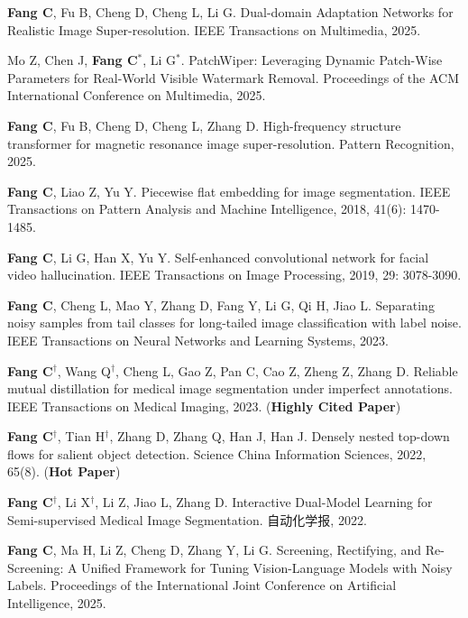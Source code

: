 \documentclass[a4paper,36pt]{article}
\newcommand{\tb}[1]{\textbf{#1}}
\newcommand{\resumeItemWithoutTitle}[1]{
  \item\justifying\small{
    {#1 \vspace{-2pt}}
  }
}
\newcommand{\resumeChnItemWithoutTitle}[1]{
  \item\justifying\small{
    {\begin{CJK}{UTF8}{gbsn}#1\end{CJK} \vspace{-2pt}}
  }
}
\begin{document}
\resumeItemWithoutTitle{\tb{Fang C}, Fu B, Cheng D, Cheng L, Li G. Dual-domain Adaptation Networks for Realistic Image Super-resolution. IEEE Transactions on Multimedia, 2025.}

\resumeItemWithoutTitle{Mo Z, Chen J, \tb{Fang C}$^\ast$, Li G$^\ast$. PatchWiper: Leveraging Dynamic Patch-Wise Parameters for Real-World Visible Watermark Removal. Proceedings of the ACM International Conference on Multimedia, 2025.}

\resumeItemWithoutTitle{\tb{Fang C}, Fu B, Cheng D, Cheng L, Zhang D. High-frequency structure transformer for magnetic resonance image super-resolution. Pattern Recognition, 2025.}

\resumeItemWithoutTitle{\tb{Fang C}, Liao Z, Yu Y. Piecewise flat embedding for image segmentation. IEEE Transactions on Pattern Analysis and Machine Intelligence, 2018, 41(6): 1470-1485. }

\resumeItemWithoutTitle{\tb{Fang C}, Li G, Han X, Yu Y. Self-enhanced convolutional network for facial video hallucination. IEEE Transactions on Image Processing, 2019, 29: 3078-3090. }

\resumeItemWithoutTitle{\tb{Fang C}, Cheng L, Mao Y, Zhang D, Fang Y, Li G, Qi H, Jiao L. Separating noisy samples from tail classes for long-tailed image classification with label noise. IEEE Transactions on Neural Networks and Learning Systems, 2023.}

\resumeItemWithoutTitle{\tb{Fang C}$^\dag$, Wang Q$^\dag$, Cheng L, Gao Z, Pan C, Cao Z, Zheng Z, Zhang D. Reliable mutual distillation for medical image segmentation under imperfect annotations. IEEE Transactions on Medical Imaging, 2023. (\tb{Highly Cited Paper})}

\resumeItemWithoutTitle{\tb{Fang C}$^\dag$, Tian H$^\dag$, Zhang D, Zhang Q, Han J, Han J. Densely nested top-down flows for salient object detection. Science China Information Sciences, 2022, 65(8). (\tb{Hot Paper}) }

\resumeChnItemWithoutTitle{\textbf{Fang C}$^\dag$, Li X$^\dag$, Li Z, Jiao L, Zhang D. Interactive Dual-Model Learning for Semi-supervised Medical Image Segmentation. 自动化学报, 2022.}

\resumeItemWithoutTitle{\tb{Fang C}, Ma H, Li Z, Cheng D, Zhang Y, Li G. Screening, Rectifying, and Re-Screening: A Unified Framework for Tuning Vision-Language Models with Noisy Labels. Proceedings of the International Joint Conference on Artificial Intelligence, 2025.} 
\vspace{-10pt}
\end{document}
